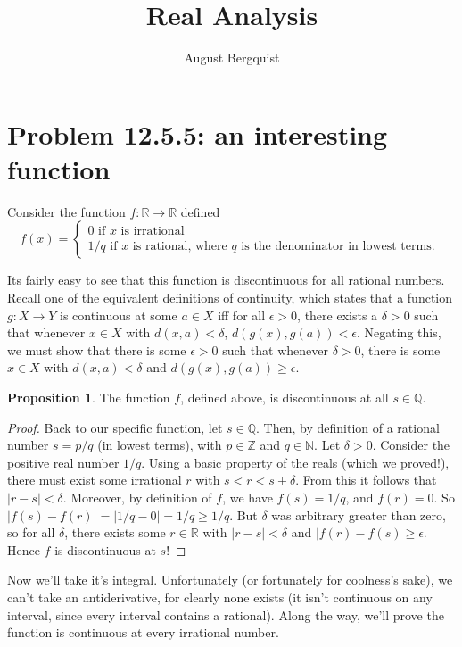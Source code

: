 \documentclass[12pt]{article}
\title{Real Analysis}
\author{August Bergquist}
\newcommand{\R}{\mathbb{R}}
\newcommand{\Z}{\mathbb{Z}}
\newcommand{\N}{\mathbb{N}}
\newcommand{\Q}{\mathbb{Q}}
\theoremstyle{definition}
\newtheorem{proposition}{Proposition}
\begin{document}
\maketitle

\section{Problem 12.5.5: an interesting function} 

Consider the function $f: \R\to \R$ defined 
\[
    f(x) = 
    \begin{cases}
        0 \mbox{ if $x$ is irrational }\\
        1/q \mbox{ if $x$ is rational, where $q$ is the denominator in lowest terms. }
    \end{cases}
    \]

Its fairly easy to see that this function is discontinuous for all rational numbers. Recall one of the equivalent definitions of continuity, which states that a function $g:X\to Y$ is continuous at some $a\in X$ iff for all $\epsilon > 0$, there exists a $\delta > 0$ such that whenever $x\in X$ with $d(x,a) < \delta$, $d(g(x), g(a)) < \epsilon$. Negating this, we must show that there is some $\epsilon > 0$ such that whenever $ \delta > 0 $, there is some $x\in X$ with $d(x,a) < \delta$ and $ d(g(x), g(a)) \ge \epsilon $. 

\begin{proposition}
    The function $f$, defined above, is discontinuous at all $s\in \Q$.
\end{proposition}

\begin{proof}
Back to our specific function, let $s\in \Q$. Then, by definition of a rational number $s = p/q$ (in lowest terms), with $p\in \Z$ and $q\in \N$. Let $\delta > 0$. Consider the positive real number $1/q$. Using a basic property of the reals (which we proved!), there must exist some irrational $r $ with $ s < r < s + \delta$. From this it follows that $ |r - s| < \delta $. Moreover, by definition of $f$, we have $f(s) = 1/q$, and $ f(r) = 0 $. So $|f(s) - f(r)| = |1/q - 0| = 1/q \ge 1/q$. But $\delta$ was arbitrary greater than zero, so for all $\delta$, there exists some $ r\in \R $ with $ |r -s| < \delta $ and $ |f(r) - f(s) \ge \epsilon $. Hence $f$ is discontinuous at $s$!
\end{proof}


Now we'll take it's integral. Unfortunately (or fortunately for coolness's sake), we can't take an antiderivative, for clearly none exists (it isn't continuous on any interval, since every interval contains a rational). Along the way, we'll prove the function is continuous at every irrational number.
\end{document}
